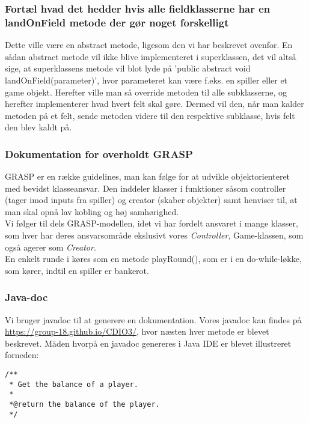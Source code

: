 \subsubsection{Fortæl hvad det hedder hvis alle fieldklasserne har en landOnField metode der gør noget forskelligt}
Dette ville være en abstract metode, ligesom den vi har beskrevet ovenfor. En sådan abstract metode vil ikke blive implementeret i superklassen, det vil altså sige, at superklassens metode vil blot lyde på 'public abstract void landOnField(parameter)', hvor parameteret kan være f.eks. en spiller eller et game objekt. Herefter ville man så override metoden til alle subklasserne, og herefter implementerer hvad hvert felt skal gøre. Dermed vil den, når man kalder metoden på et felt, sende metoden videre til den respektive subklasse, hvis felt den blev kaldt på.

\subsubsection{Dokumentation for overholdt GRASP}
GRASP er en række guidelines, man kan følge for at udvikle objektorienteret med bevidst klasseansvar. 
Den inddeler klasser i funktioner såsom controller (tager imod inputs fra spiller) og creator (skaber objekter) samt henviser til, at man skal opnå lav kobling og høj samhørighed.
\\
Vi følger til dels GRASP-modellen, idet vi har fordelt ansvaret i mange klasser, som hver har deres ansvarsområde ekslusivt vores \textit{Controller}, Game-klassen, som også agerer som \textit{Creator}.\\
En enkelt runde i køres som en metode playRound(), som er i en do-while-løkke, som kører, indtil en spiller er bankerot.

\subsubsection{Java-doc}
Vi bruger javadoc til at generere en dokumentation. Vores javadoc kan findes på \url{https://group-18.github.io/CDIO3/}, hvor næsten hver metode er blevet beskrevet.
Måden hvorpå en javadoc genereres i Java IDE er blevet illustreret forneden:
\begin{lstlisting}
/**
 * Get the balance of a player.
 *
 *@return the balance of the player.
 */
\end{lstlisting}